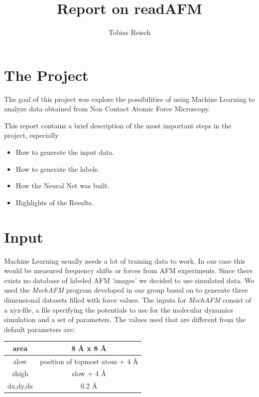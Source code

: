 \documentclass{article}
\begin{document}
\author{Tobias Reisch}
\title{Report on readAFM}
\maketitle

\section{The Project}

The goal of this project was explore the possibilities of using Machine Learning to analyze data obtained from Non Contact Atomic Force Microscopy.

This report contains a brief description of the most important steps in the project, especially
\begin{itemize}
\item How to generate the input data.
\item How to generate the labels.
\item How the Neural Net was built.
\item Highlights of the Results.
\end{itemize}

\newpage
\section{Input}

Machine Learning usually needs a lot of training data to work. In our case this would be measured frequency shifts or forces from AFM experiments. Since there exists no database of labeled AFM 'images' we decided to use simulated data. We used the \emph{MechAFM} program developed in our group based on \cite{hapala2014, hamalainen2014} to generate three dimensional datasets filled with force values. The inputs for \emph{MechAFM} consist of a xyz-file, a file specifying the potentials to use for the molecular dynamics simulation and a set of parameters. The values used that are different from the default parameters are:

\begin{center}
\begin{tabular}{|c|c|}
\hline area & 8 {\AA} x 8 {\AA} \\ 
\hline zlow & position of topmost atom + 4 {\AA} \\ 
\hline zhigh & zlow + 4 {\AA} \\ 
\hline dx,dy,dz & 0.2 {\AA} \\ 
\hline 

\end{tabular} 
\end{center}
\end{document}
